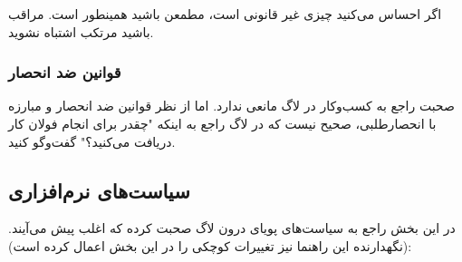 
اگر احساس می‌کنید چیزی غیر قانونی است، مطمعن باشید همینطور است. مراقب باشید مرتکب اشتباه نشوید.

\subsubsection{قوانین ضد انحصار}
صحبت راجع به کسب‌وکار در لاگ مانعی ندارد. اما از نظر قوانین ضد انحصار و مبارزه با انحصارطلبی، صحیح نیست
که در لاگ راجع به اینکه "چقدر برای انجام فولان کار دریافت می‌کنید؟" گفت‌وگو کنید.

\subsection{سیاست‌های نرم‌افزاری}
در این بخش راجع به سیاست‌های پویای درون لاگ صحبت کرده که اغلب پیش می‌آیند.
(نگهدارنده این راهنما نیز تغییرات کوچکی را در این بخش اعمال کرده است):


